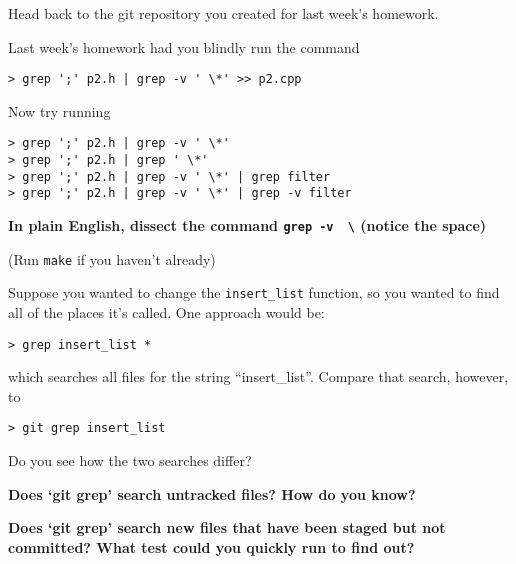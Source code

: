 \documentclass{article}
\begin{document}
\medskip
\noindent
Head back to the git repository you created for last week's homework.

\medskip
\noindent
Last week's homework had you blindly run the command
\begin{lstlisting}
> grep ';' p2.h | grep -v ' \*' >> p2.cpp
\end{lstlisting}
%
Now try running
\begin{lstlisting}
> grep ';' p2.h | grep -v ' \*'
> grep ';' p2.h | grep ' \*'
> grep ';' p2.h | grep -v ' \*' | grep filter
> grep ';' p2.h | grep -v ' \*' | grep -v filter
\end{lstlisting}
%
\textbf{In plain English, dissect the command \texttt{grep -v \textquotesingle~\textbackslash*\textquotesingle} (notice the space)}
\vspace{3cm}


\noindent
(Run \texttt{make} if you haven't already)

\medskip
\noindent
Suppose you wanted to change the \texttt{insert\_list} function, so you wanted
to find all of the places it's called. One approach would be:
\begin{lstlisting}
> grep insert_list *
\end{lstlisting}
which searches all files for the string ``insert\_list''. Compare that search,
however, to
\begin{lstlisting}
> git grep insert_list
\end{lstlisting}
Do you see how the two searches differ?

\medskip
\noindent
\textbf{Does `git grep' search untracked files? How do you know?}
\vspace{3cm}


\noindent
\textbf{Does `git grep' search new files that have been staged but not
committed? What test could you quickly run to find out?}
\vspace{3cm}
\end{document}
